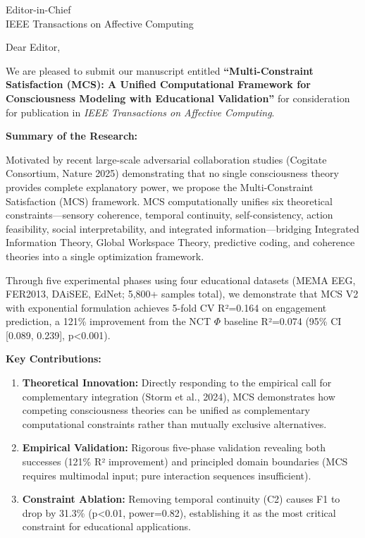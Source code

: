 \documentclass[11pt]{letter}
\begin{document}
\begin{letter}{Editor-in-Chief\\IEEE Transactions on Affective Computing}

\opening{Dear Editor,}

We are pleased to submit our manuscript entitled \textbf{``Multi-Constraint Satisfaction (MCS): A Unified Computational Framework for Consciousness Modeling with Educational Validation''} for consideration for publication in \textit{IEEE Transactions on Affective Computing}.

\textbf{Summary of the Research:}

Motivated by recent large-scale adversarial collaboration studies (Cogitate Consortium, Nature 2025) demonstrating that no single consciousness theory provides complete explanatory power, we propose the Multi-Constraint Satisfaction (MCS) framework. MCS computationally unifies six theoretical constraints---sensory coherence, temporal continuity, self-consistency, action feasibility, social interpretability, and integrated information---bridging Integrated Information Theory, Global Workspace Theory, predictive coding, and coherence theories into a single optimization framework.

Through five experimental phases using four educational datasets (MEMA EEG, FER2013, DAiSEE, EdNet; 5,800+ samples total), we demonstrate that MCS V2 with exponential formulation achieves 5-fold CV R²=0.164 on engagement prediction, a 121\% improvement from the NCT $\Phi$ baseline R²=0.074 (95\% CI [0.089, 0.239], p<0.001).

\textbf{Key Contributions:}

\begin{enumerate}
    \item \textbf{Theoretical Innovation:} Directly responding to the empirical call for complementary integration (Storm et al., 2024), MCS demonstrates how competing consciousness theories can be unified as complementary computational constraints rather than mutually exclusive alternatives.
    
    \item \textbf{Empirical Validation:} Rigorous five-phase validation revealing both successes (121\% R² improvement) and principled domain boundaries (MCS requires multimodal input; pure interaction sequences insufficient).
    
    \item \textbf{Constraint Ablation:} Removing temporal continuity (C2) causes F1 to drop by 31.3\% (p<0.01, power=0.82), establishing it as the most critical constraint for educational applications.
    

\end{enumerate}
\end{letter}
\end{document}
